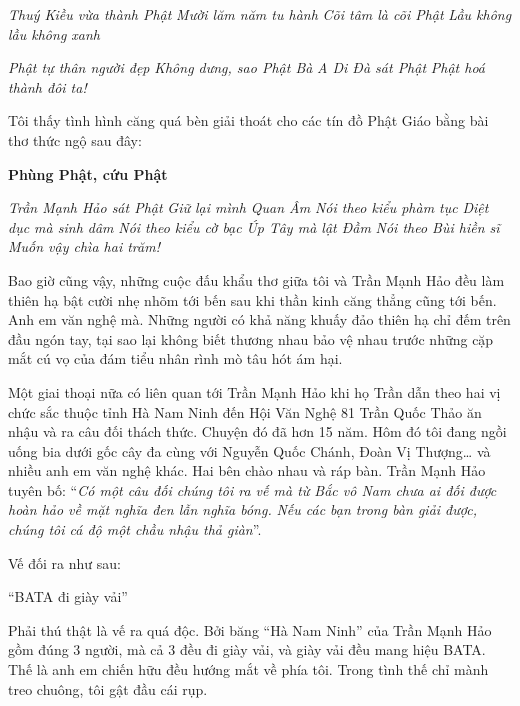 \documentclass[../main.tex]{subfiles}
\begin{document}
\begin{multicols}{2}
\begin{blockquote}
\textit{Thuý Kiều vừa thành Phật}        
\textit{Mười lăm năm tu hành}        
\textit{Cõi tâm là cõi Phật} 
\textit{Lầu không lầu không xanh} 
        
\textit{Phật tự thân người đẹp}        
\textit{Không dưng, sao Phật Bà}        
\textit{A Di Ðà sát Phật} 
\textit{Phật hoá thành đôi ta!} 

\end{blockquote}
 
Tôi thấy tình hình căng quá bèn giải thoát cho các tín đồ Phật Giáo bằng bài thơ thức ngộ sau đây: 
\begin{blockquote}
 
\textbf{Phùng Phật, cứu Phật} 
        
\textit{Trần Mạnh Hảo sát Phật}        
\textit{Giữ lại mình Quan Âm}        
\textit{Nói theo kiểu phàm tục}        
\textit{Diệt dục mà sinh dâm}        
\textit{Nói theo kiểu cờ bạc}        
\textit{Úp Tây mà lật Ðầm}        
\textit{Nói theo Bùi hiền sĩ} 
\textit{Muốn vậy chìa hai trăm!} 

\end{blockquote}
 
Bao giờ cũng vậy, những cuộc đấu khẩu thơ giữa tôi và Trần Mạnh Hảo đều làm thiên hạ bật cười nhẹ nhõm tới bến sau khi thần kinh căng thẳng cũng tới bến. Anh em văn nghệ mà. Những người có khả năng khuấy đảo thiên hạ chỉ đếm trên đầu ngón tay, tại sao lại không biết thương nhau bảo vệ nhau trước những cặp mắt cú vọ của đám tiểu nhân rình mò tâu hót ám hại. 
 
Một giai thoại nữa có liên quan tới Trần Mạnh Hảo khi họ Trần dẫn theo hai vị chức sắc thuộc tỉnh Hà Nam Ninh đến Hội Văn Nghệ 81 Trần Quốc Thảo ăn nhậu và ra câu đối thách thức. Chuyện đó đã hơn 15 năm. Hôm đó tôi đang ngồi uống bia dưới gốc cây đa cùng với Nguyễn Quốc Chánh, Ðoàn Vị Thượng… và nhiều anh em văn nghệ khác. Hai bên chào nhau và ráp bàn. Trần Mạnh Hảo tuyên bố: “\textit{Có một câu đối chúng tôi ra vế mà từ Bắc vô Nam chưa ai đối được hoàn hảo về mặt nghĩa đen lẫn nghĩa bóng.} \textit{Nếu các bạn trong bàn giải được, chúng tôi cá độ một chầu nhậu thả giàn}”. 
 
Vế đối ra như sau:        
\begin{blockquote}
        
“BATA đi giày vải” 

\end{blockquote}
 
Phải thú thật là vế ra quá độc. Bởi băng “Hà Nam Ninh” của Trần Mạnh Hảo gồm đúng 3 người, mà cả 3 đều đi giày vải, và giày vải đều mang hiệu BATA. Thế là anh em chiến hữu đều hướng mắt về phía tôi. Trong tình thế chỉ mành treo chuông, tôi gật đầu cái rụp. 
 

\end{multicols}
\end{document}
